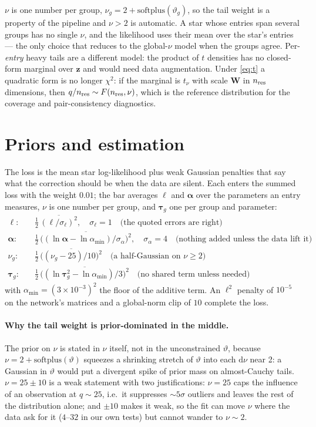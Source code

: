 \documentclass[11pt,a4paper]{article}
\newcommand{\bv}[1]{\boldsymbol{#1}}          %
\newcommand{\bM}[1]{\boldsymbol{#1}}          %
\newcommand{\dd}{\mathrm{d}}
\begin{document}
$\nu$ is one number per group, $\nu_g = 2+\mathrm{softplus}(\vartheta_g)$, so the
tail weight is a property of the pipeline and $\nu>2$ is automatic. A star whose
entries span several groups has no single $\nu$, and the likelihood uses their
mean over the star's entries --- the only choice that reduces to the global-$\nu$
model when the groups agree. Per-\emph{entry} heavy tails are a different model:
the product of $t$ densities has no closed-form marginal over $\bv z$ and would
need data augmentation. Under \eqref{eq:t} a quadratic form is no longer
$\chi^2$: if the marginal is $t_\nu$ with scale $\bM W$ in $n_{\rm res}$
dimensions, then $q/n_{\rm res}\sim F(n_{\rm res},\nu)$, which is the reference
distribution for the coverage and pair-consistency diagnostics.

\section{Priors and estimation}
\label{sec:est}

The loss is the mean star log-likelihood plus weak Gaussian penalties that say
what the correction should be when the data are silent. Each enters the summed
loss with the weight $0.01$; the bar averages $\bv\ell$ and $\bv\alpha$ over the
parameters an entry measures, $\nu$ is one number per group, and $\bv\tau_g$ one
per group and parameter:
\begin{align}
  \bv\ell:\quad &\tfrac12\,\overline{(\bv\ell/\sigma_\ell)^2},
  \quad \sigma_\ell=1
  \quad\text{(the quoted errors are right)} \\
  \bv\alpha:\quad &\tfrac12\,\overline{\big((\ln\bv\alpha-\ln\alpha_{\min})/\sigma_\alpha\big)^2},
  \quad \sigma_\alpha=4
  \quad\text{(nothing added unless the data lift it)} \\
  \nu_g:\quad &\tfrac12\,\overline{\big((\nu_g-25)/10\big)^2}
  \quad\text{(a half-Gaussian on $\nu\ge2$)} \\
  \bv\tau_g:\quad &\tfrac12\,\overline{\big((\ln\bv\tau_g^2-\ln\alpha_{\min})/3\big)^2}
  \quad\text{(no shared term unless needed)}
\end{align}
with $\alpha_{\min} = (3\times10^{-3})^2$ the floor of the additive term.
An $\ell^2$ penalty of $10^{-5}$ on the network's matrices and a global-norm clip
of $10$ complete the loss.

\paragraph{Why the tail weight is prior-dominated in the middle.} The prior on
$\nu$ is stated in $\nu$ itself, not in the unconstrained $\vartheta$, because
$\nu = 2+\mathrm{softplus}(\vartheta)$ squeezes a shrinking stretch of
$\vartheta$ into each $\dd\nu$ near 2: a Gaussian in $\vartheta$ would put a
divergent spike of prior mass on almost-Cauchy tails. $\nu = 25\pm10$ is a weak
statement with two justifications: $\nu=25$ caps the influence of an observation
at $q\sim25$, i.e.\ it suppresses $\sim5\sigma$ outliers and leaves the rest of
the distribution alone; and $\pm10$ makes it weak, so the fit can move $\nu$ where
the data ask for it ($4$--$32$ in our own tests) but cannot wander to $\nu\sim2$.
\end{document}
